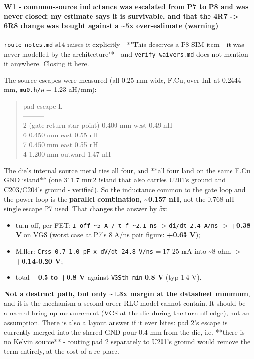 \documentclass[11pt,a4paper]{article}
\begin{document}
\paragraph*{W1 - common-source inductance was escalated from P7 to P8 and was never closed; my estimate says it is survivable, and that the 4R7 -\textgreater{} 6R8 change was bought against a \textasciitilde{}5x over-estimate (warning)}
\texttt{route-notes.md} s14 raises it explicitly - {*}"This deserves a P8 SIM item - it was never modelled by the architecture"{*} - and \texttt{verify-waivers.md} does not mention it anywhere. Closing it here.

The source escapes were measured (all 0.25 mm wide, F.Cu, over In1 at 0.2444 mm, \texttt{mu0.h/w} = 1.23 nH/mm):

\begin{quote}\small\ttfamily\raggedright
\textbar{} pad \textbar{} escape \textbar{} L \textbar{}\\
\textbar{}---\textbar{}---\textbar{}---\textbar{}\\
\textbar{} 2 (gate-return star point) \textbar{} 0.400 mm west \textbar{} 0.49 nH \textbar{}\\
\textbar{} 6 \textbar{} 0.450 mm east \textbar{} 0.55 nH \textbar{}\\
\textbar{} 7 \textbar{} 0.450 mm east \textbar{} 0.55 nH \textbar{}\\
\textbar{} 4 \textbar{} 1.200 mm outward \textbar{} 1.47 nH \textbar{}
\end{quote}
The die's internal source metal ties all four, and {*}{*}all four land on the same F.Cu GND island{*}{*} (one 311.7 mm2 island that also carries U201's ground and C203/C204's ground - verified). So the inductance common to the gate loop and the power loop is the \textbf{parallel combination, \textasciitilde{}0.157 nH}, not the 0.768 nH single escape P7 used. That changes the answer by 5x:

\begin{itemize}
\item turn-off, per FET: \texttt{I\_off \textasciitilde{}5 A / t\_f \textasciitilde{}2.1 ns} -\textgreater{} \texttt{di/dt 2.4 A/ns} -\textgreater{}
\textbf{+0.38 V} on VGS (worst case at P7's 8 A/ns pair figure: \textbf{+0.63 V});
\item Miller: \texttt{Crss 0.7-1.0 pF x dV/dt 24.8 V/ns} = 17-25 mA into \textasciitilde{}8 ohm -\textgreater{}
\textbf{+0.14-0.20 V};
\item total \textbf{+0.5 to +0.8 V} against \texttt{VGSth\_min} \textbf{0.8 V} (typ 1.4 V).
\end{itemize}
\textbf{Not a destruct path, but only \textasciitilde{}1.3x margin at the datasheet minimum}, and it is the mechanism a second-order RLC model cannot contain. It should be a named bring-up measurement (VGS at the die during the turn-off edge), not an assumption. There is also a layout answer if it ever bites: pad 2's escape is currently merged into the shared GND pour 0.4 mm from the die, i.e. {*}{*}there is no Kelvin source{*}{*} - routing pad 2 separately to U201's ground would remove the term entirely, at the cost of a re-place.
\end{document}
